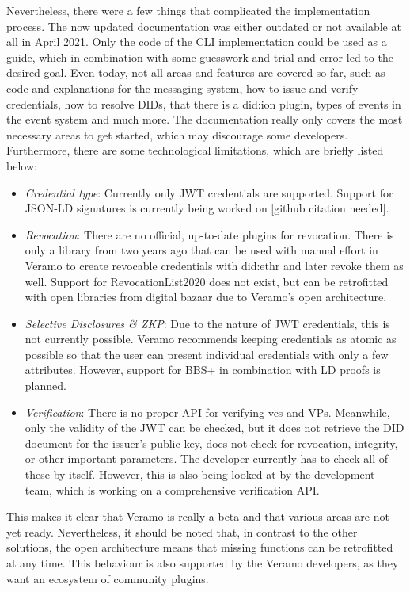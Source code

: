     Nevertheless, there were a few things that complicated the implementation process. The now updated documentation was either outdated or not available at all in April 2021. Only the code of the CLI implementation could be used as a guide, which in combination with some guesswork and trial and error led to the desired goal. Even today, not all areas and features are covered so far, such as code and explanations for the messaging system, how to issue and verify credentials, how to resolve \acp{DID}, that there is a did:ion plugin, types of events in the event system and much more. The documentation really only covers the most necessary areas to get started, which may discourage some developers. Furthermore, there are some technological limitations, which are briefly listed below:
    
\begin{itemize}
    \item \textit{Credential type}: Currently only JWT credentials are supported. Support for JSON-LD signatures is currently being worked on [github citation needed].
    \item \textit{Revocation}: There are no official, up-to-date plugins for revocation. There is only a library from two years ago that can be used with manual effort in Veramo to create revocable credentials with did:ethr and later revoke them as well. Support for RevocationList2020 does not exist, but can be retrofitted with open libraries from digital bazaar due to Veramo's open architecture.
    \item \textit{Selective Disclosures \& ZKP}: Due to the nature of JWT credentials, this is not currently possible. Veramo recommends keeping credentials as atomic as possible so that the user can present individual credentials with only a few attributes. However, support for BBS+ in combination with LD proofs is planned.
    \item \textit{Verification}: There is no proper API for verifying \acp{vc} and \acp{VP}. Meanwhile, only the validity of the JWT can be checked, but it does not retrieve the \ac{DID} document for the issuer's public key, does not check for revocation, integrity, or other important parameters. The developer currently has to check all of these by itself. However, this is also being looked at by the development team, which is working on a comprehensive verification API.
\end{itemize}

    This makes it clear that Veramo is really a beta and that various areas are not yet ready. Nevertheless, it should be noted that, in contrast to the other solutions, the open architecture means that missing functions can be retrofitted at any time. This behaviour is also supported by the Veramo developers, as they want an ecosystem of community plugins.
    
